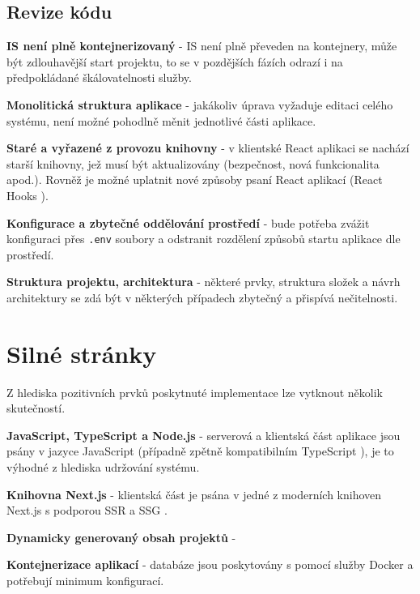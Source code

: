 \subsection{Revize kódu}

\begin{ul}
   \item
   \textbf{\gls{IS} není plně kontejnerizovaný} - \gls{IS} není plně převeden na kontejnery, může být zdlouhavější start projektu, to se v pozdějších fázích odrazí i na předpokládané škálovatelnosti služby.
   \item
   \textbf{Monolitická struktura aplikace} - jakákoliv úprava vyžaduje editaci celého systému, není možné pohodlně měnit jednotlivé části aplikace.
   \item
   \textbf{Staré a vyřazené z provozu knihovny} - v klientské React aplikaci se nachází starší knihovny, jež musí být aktualizovány (bezpečnost, nová funkcionalita apod.).
   Rovněž je možné uplatnit nové způsoby psaní React aplikací (React Hooks ).
   \item
   \textbf{Konfigurace a zbytečné oddělování prostředí} - bude potřeba zvážit konfiguraci přes \texttt{.env} soubory  a odstranit rozdělení způsobů startu aplikace dle prostředí.
   \item
   \textbf{Struktura projektu, architektura} - některé prvky, struktura složek a návrh architektury se zdá být v některých případech zbytečný a přispívá nečitelnosti.
\end{ul}



\section{Silné stránky}
Z hlediska pozitivních prvků poskytnuté implementace lze vytknout několik skutečností.

\begin{ul}
   \item
   \textbf{JavaScript, TypeScript a Node.js} - serverová a klientská část aplikace jsou psány v jazyce JavaScript (případně zpětně kompatibilním TypeScript ), je to výhodné z hlediska udržování systému.
   \item
   \textbf{Knihovna Next.js} - klientská část je psána v jedné z moderních knihoven Next.js s podporou \gls{SSR} a \gls{SSG} .
   \item
   \textbf{Dynamicky generovaný obsah projektů} -
   \item
   \textbf{Kontejnerizace aplikací} - databáze jsou poskytovány s pomocí služby Docker  a potřebují minimum konfigurací.
\end{ul}



